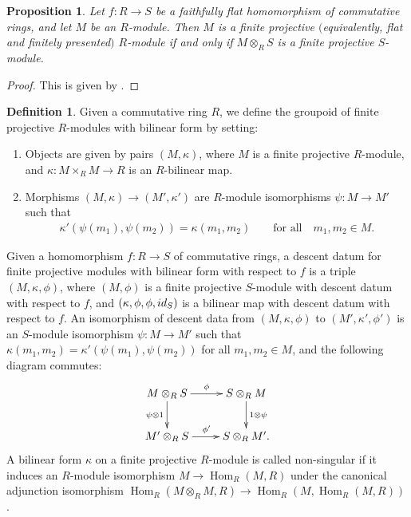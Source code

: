 \documentclass[11pt]{article}
\DeclareMathOperator{\Hom}{Hom}
\newtheorem{prop}[thm]{Proposition}
\theoremstyle{definition}
\newtheorem{defn}[thm]{Definition}
\begin{document}
\begin{prop} \label{prop:finite-projective-property-descends} Let $f\colon R \to S$ be a faithfully flat homomorphism of commutative rings, and let $M$ be an $R$-module. Then $M$ is a finite projective $($equivalently, flat and finitely presented$)$ $R$-module if and only if $M \otimes_{R} S$ is a finite projective $S$-module.
\end{prop}
\begin{proof}This is given by \cite[Proposition 2.5.2]{EGA4v2}.
\end{proof}

\begin{defn}Given a commutative ring $R$, we define the groupoid of finite projective $R$-modules with bilinear form by setting:
\begin{enumerate}\itemsep=0pt
\item Objects are given by pairs $(M, \kappa)$, where $M$ is a finite projective $R$-module, and $\kappa\colon M \times_R M \to R$ is an $R$-bilinear map.
\item Morphisms $(M, \kappa) \to (M', \kappa')$ are $R$-module isomorphisms $\psi\colon M \to M'$ such that
\begin{gather*} \kappa'(\psi(m_1), \psi(m_2)) = \kappa(m_1,m_2) \qquad \text{for all} \quad m_1,m_2 \in M.\end{gather*}
\end{enumerate}
Given a homomorphism $f\colon R \to S$ of commutative rings, a descent datum for finite projective modules with bilinear form with respect to $f$ is a triple $(M, \kappa, \phi)$, where $(M, \phi)$ is a finite projective $S$-module with descent datum with respect to $f$, and $(\kappa, \phi, \phi, {\rm id}_S)$ is a bilinear map with descent datum with respect to $f$. An isomorphism of descent data from $(M, \kappa, \phi)$ to $(M', \kappa', \phi')$ is an $S$-module isomorphism $\psi\colon M \to M'$ such that $\kappa(m_1,m_2) = \kappa'(\psi(m_1),\psi(m_2))$ for all $m_1,m_2 \in M$, and the following diagram commutes:
\begin{gather*} \xymatrix{ M \otimes_{R} S \ar[r]^{\phi} \ar[d]_{\psi \otimes 1} & S \otimes_{R} M \ar[d]^{1 \otimes \psi} \\
M' \otimes_{R} S \ar[r]^{\phi'} & S \otimes_{R} M'. } \end{gather*}
A bilinear form $\kappa$ on a finite projective $R$-module is called non-singular if it induces an $R$-module isomorphism $M \to \Hom_R(M,R)$ under the canonical adjunction isomorphism $\Hom_R(M \otimes_{R} M, R) \to \Hom_R(M, \Hom_R(M,R))$.
\end{defn}
\end{document}
